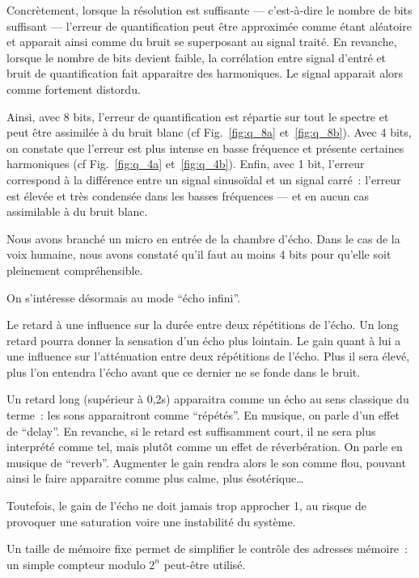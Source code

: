 \documentclass{article}
\begin{document}
Concrètement, lorsque la résolution est suffisante --- c'est-à-dire le nombre de bits suffisant --- l'erreur de quantification peut être approximée comme étant aléatoire et apparait ainsi comme du bruit se superposant au signal traité. En revanche, lorsque le nombre de bits devient faible, la corrélation entre signal d'entré et bruit de quantification fait apparaitre des harmoniques. Le signal apparait alors comme fortement distordu.

Ainsi, avec 8 bits, l'erreur de quantification est répartie sur tout le spectre et peut être assimilée à du bruit blanc (cf Fig.~\ref{fig:q_8a} et~\ref{fig:q_8b}).
Avec 4 bits, on constate que l'erreur est plus intense en basse fréquence et présente certaines harmoniques (cf Fig.~\ref{fig:q_4a} et~\ref{fig:q_4b}).
Enfin, avec 1 bit, l'erreur correspond à la différence entre un signal sinusoïdal et un signal carré~: l'erreur est élevée et très condensée dans les basses fréquences --- et en aucun cas assimilable à du bruit blanc.

Nous avons branché un micro en entrée de la chambre d'écho. Dans le cas de la voix humaine, nous avons constaté qu'il faut au moins 4 bits pour qu'elle soit pleinement compréhensible.



On s'intéresse désormais au mode ``écho infini''.

Le retard à une influence sur la durée entre deux répétitions de l'écho. Un long retard pourra donner la sensation d'un écho plus lointain.
Le gain quant à lui a une influence sur l'atténuation entre deux répétitions de l'écho. Plus il sera élevé, plus l'on entendra l'écho avant que ce dernier ne se fonde dans le bruit.

Un retard long (supérieur à 0,2s) apparaitra comme un écho au sens classique du terme~: les sons apparaitront comme ``répétés''. En musique, on parle d'un effet de ``delay''. En revanche, si le retard est suffisamment court, il ne sera plus interprété comme tel, mais plutôt comme un effet de réverbération. On parle en musique de ``reverb''. Augmenter le gain rendra alors le son comme flou, pouvant ainsi le faire apparaitre comme plus calme, plus ésotérique\dots

Toutefois, le gain de l'écho ne doit jamais trop approcher 1, au risque de provoquer une saturation voire une instabilité du système.



Un taille de mémoire fixe permet de simplifier le contrôle des adresses mémoire~: un simple compteur modulo $2^n$ peut-être utilisé.
\end{document}
